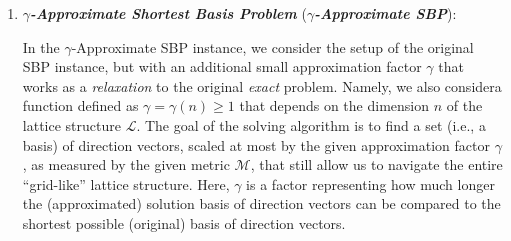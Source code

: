\documentclass[runningheads]{llncs}
\numberwithin{equation}{section}
\begin{document}
\begin{enumerate}
        In the $\gamma$-Approximate SIVP instance, we consider the setup of the original SIVP instance, but with an additional small approximation factor $\gamma$ that works as a \textit{relaxation} to the original \textit{exact} problem. Namely, we also consider\break a function defined as $\gamma = \gamma(n) \geq 1$ that depends on the dimension $n$ of the lattice structure $\mathcal{L}$. The goal of the solving algorithm is to find a set (i.e., a basis) of $n$ linearly independent and short non-zero vectors\break $B' = \{ \Vec{{b'}_{1}}, \Vec{{b'}_{2}}, ..., \Vec{{b'}_{n}} \}$, so that ${\max}_{i} {||\Vec{{b'}_{i}}||}_{\mathcal{M}} \leq \gamma \cdot {\max}_{B} {||\Vec{{b}_{i}}||}_{\mathcal{M}}$, where $1 \leq i \leq n$ and $B = \{ \Vec{{b}_{1}}, \Vec{{b}_{2}}, ..., \Vec{{b}_{n}} \}$. In other words, in the best scenario, we seek to minimize the length of the longest vector in the original basis $B$ and find a new basis $B'$, scaled at most by the given approximation factor $\gamma$, that yields the same lattice structure $\mathcal{L}$. Here, $\gamma$ is a factor representing how much longer the (approximated) linearly independent vectors can be compared to the shortest possible (original) linearly independent vectors. 
        \vspace{2ex}

        \newpage
        
        \item \textbf{\textit{$\gamma$-Approximate Shortest Basis Problem}} (\textbf{\textit{$\gamma$-Approximate SBP}}):
        \vspace{0.6ex}

        In the $\gamma$-Approximate SBP instance, we consider the setup of the original SBP instance, but with an additional small approximation factor $\gamma$ that works as a \textit{relaxation} to the original \textit{exact} problem. Namely, we also consider\break a function defined as $\gamma = \gamma(n) \geq 1$ that depends on the dimension $n$ of the lattice structure $\mathcal{L}$. The goal of the solving algorithm is to find a set (i.e., a basis) of direction vectors, scaled at most by the given approximation factor $\gamma$, as measured by the given metric $\mathcal{M}$, that still allow us to navigate the entire “grid-like” lattice structure. Here, $\gamma$ is a factor representing how much longer the (approximated) solution basis of direction vectors can be compared to the shortest possible (original) basis of direction vectors.
        \vspace{2ex}
        

\end{enumerate}
\end{document}
